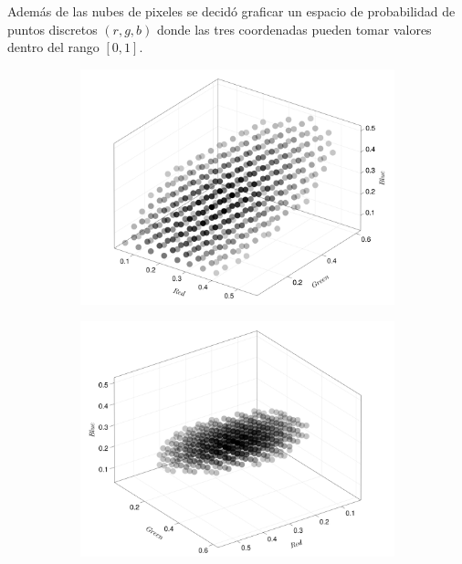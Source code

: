 Además de las nubes de pixeles se decidó graficar un espacio de probabilidad de puntos discretos $(r,g,b)$ donde las tres coordenadas pueden tomar valores dentro del rango $[0,1]$.
\begin{figure}[ht!]
    \centering
    \begin{subfigure}[c]{0.3\textwidth}
        \centering
        \includegraphics[scale=0.09]{../figures/gaussian_cloud_akira_1}
    \end{subfigure}
    \begin{subfigure}[c]{0.3\textwidth}
        \centering
        \includegraphics[scale=0.09]{../figures/gaussian_cloud_akira_2}
    \end{subfigure}
    \begin{subfigure}[c]{0.3\textwidth}

\end{subfigure}
\end{figure}

